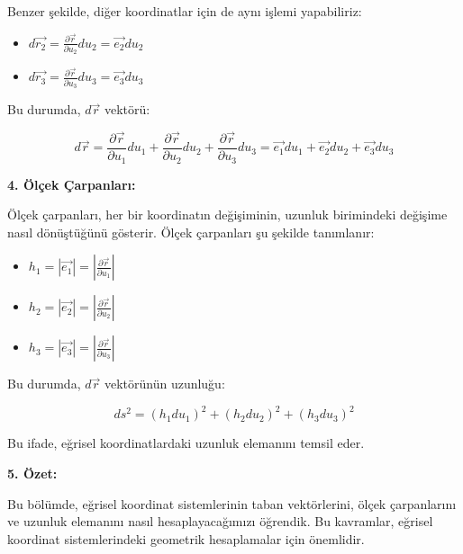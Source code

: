 \documentclass[11pt,letterpaper,twocolumn]{fenbil}
\begin{document}
Benzer şekilde, diğer koordinatlar için de aynı işlemi yapabiliriz:

\begin{itemize}
    \item $d\vec{r_2} = \frac{\partial \vec{r}}{\partial u_2} du_2 = \vec{e_2} du_2$
    \item $d\vec{r_3} = \frac{\partial \vec{r}}{\partial u_3} du_3 = \vec{e_3} du_3$
\end{itemize}

Bu durumda, $d\vec{r}$ vektörü:

\begin{equation}
d\vec{r} = \frac{\partial \vec{r}}{\partial u_1} du_1 + \frac{\partial \vec{r}}{\partial u_2} du_2 + \frac{\partial \vec{r}}{\partial u_3} du_3 = \vec{e_1} du_1 + \vec{e_2} du_2 + \vec{e_3} du_3
\end{equation}

\textbf{4. Ölçek Çarpanları:}

Ölçek çarpanları, her bir koordinatın değişiminin, uzunluk birimindeki değişime nasıl dönüştüğünü gösterir. Ölçek çarpanları şu şekilde tanımlanır:

\begin{itemize}
    \item $h_1 = |\vec{e_1}| = \left| \frac{\partial \vec{r}}{\partial u_1} \right|$
    \item $h_2 = |\vec{e_2}| = \left| \frac{\partial \vec{r}}{\partial u_2} \right|$
    \item $h_3 = |\vec{e_3}| = \left| \frac{\partial \vec{r}}{\partial u_3} \right|$
\end{itemize}

Bu durumda, $d\vec{r}$ vektörünün uzunluğu:

\begin{equation}
ds^2 = (h_1 du_1)^2 + (h_2 du_2)^2 + (h_3 du_3)^2
\end{equation}

Bu ifade, eğrisel koordinatlardaki uzunluk elemanını temsil eder.

\textbf{5. Özet:}

Bu bölümde, eğrisel koordinat sistemlerinin taban vektörlerini, ölçek çarpanlarını ve uzunluk elemanını nasıl hesaplayacağımızı öğrendik. Bu kavramlar, eğrisel koordinat sistemlerindeki geometrik hesaplamalar için önemlidir.
\end{document}
